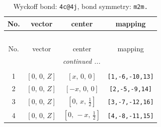 \documentclass[fleqn,8pt]{jsarticle}
\begin{document}
\renewcommand{\arraystretch}{1.2}
\begin{longtable}{cccc}
\caption{Wyckoff bond: {\tt 4c@4j}, bond symmetry: {\tt m2m.}}
 \\
 \hline \hline
No. & vector & center & mapping \\ \hline \endfirsthead

\multicolumn{3}{l}{\tablename\ \thetable{}} \\
 \hline \hline
No. & vector & center & mapping \\ \hline \endhead

 \hline \hline
\multicolumn{3}{r}{\footnotesize\it continued ...} \\ \endfoot

 \hline \hline
\multicolumn{3}{r}{} \\ \endlastfoot

1 & $\left[ 0,\, 0,\, Z \right]$ & $\left[ x,\, 0,\, 0 \right]$ & {\tt [1,-6,-10,13]} \\ \hline
2 & $\left[ 0,\, 0,\, Z \right]$ & $\left[ - x,\, 0,\, 0 \right]$ & {\tt [2,-5,-9,14]} \\ \hline
3 & $\left[ 0,\, 0,\, Z \right]$ & $\left[ 0,\, x,\, \frac{1}{2} \right]$ & {\tt [3,-7,-12,16]} \\ \hline
4 & $\left[ 0,\, 0,\, Z \right]$ & $\left[ 0,\, - x,\, \frac{1}{2} \right]$ & {\tt [4,-8,-11,15]} \\
\end{longtable}
\renewcommand{\arraystretch}{1.2}
\end{document}
